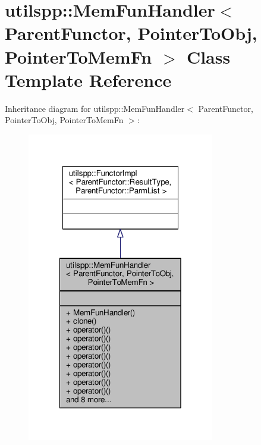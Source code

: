 \hypertarget{classutilspp_1_1MemFunHandler}{\section{utilspp\-:\-:Mem\-Fun\-Handler$<$ Parent\-Functor, Pointer\-To\-Obj, Pointer\-To\-Mem\-Fn $>$ Class Template Reference}
\label{classutilspp_1_1MemFunHandler}
}


Inheritance diagram for utilspp\-:\-:Mem\-Fun\-Handler$<$ Parent\-Functor, Pointer\-To\-Obj, Pointer\-To\-Mem\-Fn $>$\-:
\nopagebreak
\begin{figure}[H]
\begin{center}
\leavevmode
\includegraphics[width=232pt]{classutilspp_1_1MemFunHandler__inherit__graph}
\end{center}
\end{figure}


